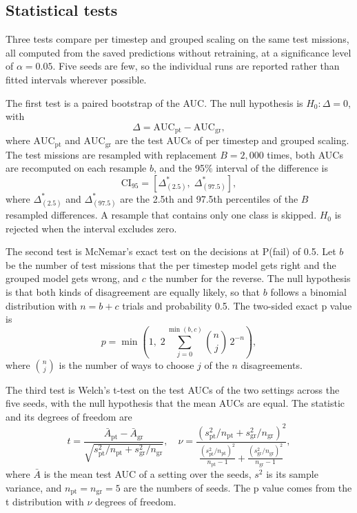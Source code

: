 \subsection{Statistical tests}
\label{sec:stats}

Three tests compare per timestep and grouped scaling on the same test missions, all computed from the saved predictions without retraining, at a significance level of $\alpha = 0.05$. Five seeds are few, so the individual runs are reported rather than fitted intervals wherever possible.

The first test is a paired bootstrap of the AUC. The null hypothesis is $H_0 : \Delta = 0$, with
\begin{equation}
\Delta = \mathrm{AUC}_{\mathrm{pt}} - \mathrm{AUC}_{\mathrm{gr}},
\label{eq:delta}
\end{equation}
where $\mathrm{AUC}_{\mathrm{pt}}$ and $\mathrm{AUC}_{\mathrm{gr}}$ are the test AUCs of per timestep and grouped scaling. The test missions are resampled with replacement $B = 2{,}000$ times, both AUCs are recomputed on each resample $b$, and the 95\% interval of the difference is
\begin{equation}
\mathrm{CI}_{95} = \left[ \Delta^{*}_{(2.5)}, \; \Delta^{*}_{(97.5)} \right],
\label{eq:boot}
\end{equation}
where $\Delta^{*}_{(2.5)}$ and $\Delta^{*}_{(97.5)}$ are the 2.5th and 97.5th percentiles of the $B$ resampled differences. A resample that contains only one class is skipped. $H_0$ is rejected when the interval excludes zero.

The second test is McNemar's exact test on the decisions at P(fail) of 0.5. Let $b$ be the number of test missions that the per timestep model gets right and the grouped model gets wrong, and $c$ the number for the reverse. The null hypothesis is that both kinds of disagreement are equally likely, so that $b$ follows a binomial distribution with $n = b + c$ trials and probability 0.5. The two-sided exact p value is
\begin{equation}
p = \min \left( 1, \; 2 \sum_{j=0}^{\min(b,c)}{ \binom{n}{j} } \, 2^{-n} \right),
\label{eq:mcnemar}
\end{equation}
where $\binom{n}{j}$ is the number of ways to choose $j$ of the $n$ disagreements.

The third test is Welch's t-test on the test AUCs of the two settings across the five seeds, with the null hypothesis that the mean AUCs are equal. The statistic and its degrees of freedom are
\begin{equation}
t = \frac{ \bar{A}_{\mathrm{pt}} - \bar{A}_{\mathrm{gr}} }{ \sqrt{ s_{\mathrm{pt}}^2 / n_{\mathrm{pt}} + s_{\mathrm{gr}}^2 / n_{\mathrm{gr}} } }, \quad \nu = \frac{ \left( s_{\mathrm{pt}}^2 / n_{\mathrm{pt}} + s_{\mathrm{gr}}^2 / n_{\mathrm{gr}} \right)^2 }{ \frac{ (s_{\mathrm{pt}}^2 / n_{\mathrm{pt}})^2 }{ n_{\mathrm{pt}} - 1 } + \frac{ (s_{\mathrm{gr}}^2 / n_{\mathrm{gr}})^2 }{ n_{\mathrm{gr}} - 1 } },
\label{eq:welch}
\end{equation}
where $\bar{A}$ is the mean test AUC of a setting over the seeds, $s^2$ is its sample variance, and $n_{\mathrm{pt}} = n_{\mathrm{gr}} = 5$ are the numbers of seeds. The p value comes from the t distribution with $\nu$ degrees of freedom.


